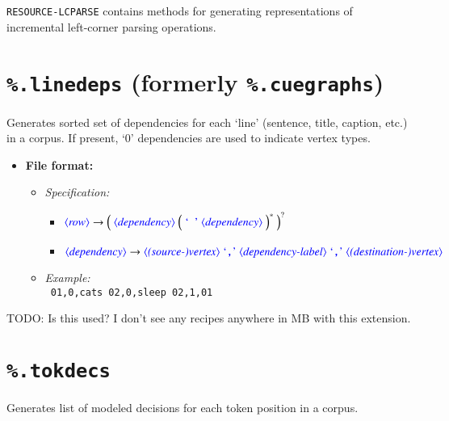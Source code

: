 \documentclass[12pt]{report}
\def\blue{\color{blue}}
\def\magenta{\color{magenta}}
\def\red{\color{red}}
\begin{document}
{\tt RESOURCE-LCPARSE} contains methods for generating representations of incremental left-corner parsing operations.

\section{{\blue\tt \%.linedeps} (formerly {\red\tt \%.cuegraphs})}
Generates sorted set of dependencies for each `line' (sentence, title, caption, etc.) in a corpus. If present, `0' dependencies are used to indicate vertex types.

\begin{itemize}
      \item \textbf{File format:}
      \begin{itemize}
            \item \textit{Specification:}
            \begin{itemize}
                  \item {\small $\dtype{row}        \rightarrow \Big( \ \dtype{dependency} \ \Big( \ \dcode{\ } \ \dtype{dependency} \ \Big)^* \ \Big)^?$}
                  \item {\small $\dtype{dependency} \rightarrow \dtype{(source-)vertex} \ \dcode{,} \ \dtype{dependency-label} \ \dcode{,} \ \dtype{(destination-)vertex}$}
            \end{itemize}
            \item \textit{Example:}\\
            {\magenta\tt
            01,0,cats 02,0,sleep 02,1,01
            }
      \end{itemize}
\end{itemize}

TODO: Is this used? I don't see any recipes anywhere in MB with this extension.

\section{{\blue\tt \%.tokdecs}}

Generates list of modeled decisions for each token position in a corpus.
\end{document}
